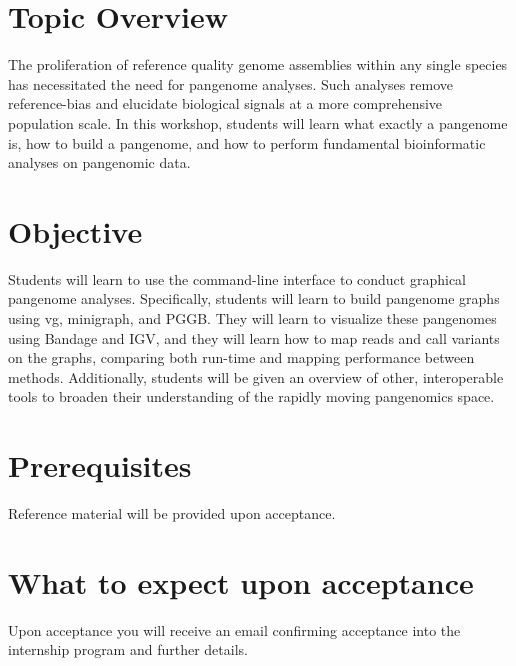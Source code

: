\documentclass[
]{book}
\begin{document}
\hypertarget{topic-overview}{%
\section*{Topic Overview}\label{topic-overview}}

The proliferation of reference quality genome assemblies within any single species has necessitated the need for pangenome analyses. Such analyses remove reference-bias and elucidate biological signals at a more comprehensive population scale. In this workshop, students will learn what exactly a pangenome is, how to build a pangenome, and how to perform fundamental bioinformatic analyses on pangenomic data.

\hypertarget{objective}{%
\section*{Objective}\label{objective}}

Students will learn to use the command-line interface to conduct graphical pangenome analyses. Specifically, students will learn to build pangenome graphs using vg, minigraph, and PGGB. They will learn to visualize these pangenomes using Bandage and IGV, and they will learn how to map reads and call variants on the graphs, comparing both run-time and mapping performance between methods. Additionally, students will be given an overview of other, interoperable tools to broaden their understanding of the rapidly moving pangenomics space.

\hypertarget{prerequisites}{%
\section*{Prerequisites}\label{prerequisites}}

Reference material will be provided upon acceptance.

\hypertarget{what-to-expect-upon-acceptance}{%
\section*{What to expect upon acceptance}\label{what-to-expect-upon-acceptance}}

Upon acceptance you will receive an email confirming acceptance into the internship program and further details.
\end{document}
